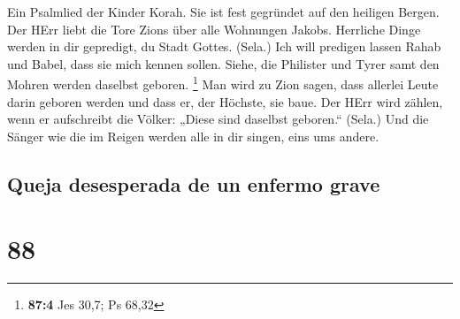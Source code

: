  Ein Psalmlied der Kinder Korah. Sie ist fest gegründet
auf den heiligen Bergen.  Der HErr liebt die Tore Zions
über alle Wohnungen Jakobs.  Herrliche Dinge werden in dir
gepredigt, du Stadt Gottes. (Sela.)  Ich will predigen
lassen Rahab und Babel, dass sie mich kennen sollen. Siehe, die
Philister und Tyrer samt den Mohren werden daselbst geboren. \footnote{\textbf{87:4}
  Jes 30,7; Ps 68,32}  Man wird zu Zion sagen, dass
allerlei Leute darin geboren werden und dass er, der Höchste, sie baue.
 Der HErr wird zählen, wenn er aufschreibt die Völker:
„Diese sind daselbst geboren.`` (Sela.)  Und die Sänger
wie die im Reigen werden alle in dir singen, eins ums andere.

\hypertarget{queja-desesperada-de-un-enfermo-grave}{%
\subsection{Queja desesperada de un enfermo
grave}\label{queja-desesperada-de-un-enfermo-grave}}

\hypertarget{section-87}{%
\section{88}\label{section-87}}

